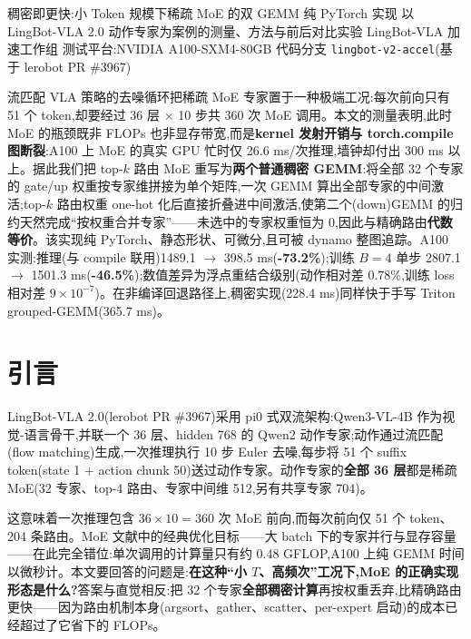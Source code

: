 \documentclass[11pt]{ctexart}
\begin{document}
{稠密即更快:小 Token 规模下稀疏 MoE 的双 GEMM 纯 PyTorch 实现}
{以 LingBot-VLA 2.0 动作专家为案例的测量、方法与前后对比实验}
{LingBot-VLA 加速工作组 \quad 测试平台:NVIDIA A100-SXM4-80GB \quad 代码分支 \texttt{lingbot-v2-accel}(基于 lerobot PR \#3967)}

\begin{cnabstract}
流匹配 VLA 策略的去噪循环把稀疏 MoE 专家置于一种极端工况:每次前向只有 51 个 token,却要经过 36 层 $\times$ 10 步共 360 次 MoE 调用。本文的测量表明,此时 MoE 的瓶颈既非 FLOPs 也非显存带宽,而是\textbf{kernel 发射开销与 torch.compile 图断裂}:A100 上 MoE 的真实 GPU 忙时仅 26.6 ms/次推理,墙钟却付出 300 ms 以上。据此我们把 top-$k$ 路由 MoE 重写为\textbf{两个普通稠密 GEMM}:将全部 32 个专家的 gate/up 权重按专家维拼接为单个矩阵,一次 GEMM 算出全部专家的中间激活;top-$k$ 路由权重 one-hot 化后直接折叠进中间激活,使第二个(down)GEMM 的归约天然完成``按权重合并专家''——未选中的专家权重恒为 0,因此与精确路由\textbf{代数等价}。该实现纯 PyTorch、静态形状、可微分,且可被 dynamo 整图追踪。A100 实测:推理(与 compile 联用)1489.1 $\to$ 398.5 ms(\textbf{-73.2\%});训练 $B{=}4$ 单步 2807.1 $\to$ 1501.3 ms(\textbf{-46.5\%});数值差异为浮点重结合级别(动作相对差 0.78\%,训练 loss 相对差 $9\times10^{-7}$)。在非编译回退路径上,稠密实现(228.4 ms)同样快于手写 Triton grouped-GEMM(365.7 ms)。
\end{cnabstract}

\section{引言}
LingBot-VLA 2.0(lerobot PR \#3967)采用 pi0 式双流架构:Qwen3-VL-4B 作为视觉-语言骨干,并联一个 36 层、hidden 768 的 Qwen2 动作专家;动作通过流匹配(flow matching)生成,一次推理执行 10 步 Euler 去噪,每步将 51 个 suffix token(state 1 + action chunk 50)送过动作专家。动作专家的\textbf{全部 36 层}都是稀疏 MoE(32 专家、top-4 路由、专家中间维 512,另有共享专家 704)。

这意味着一次推理包含 $36 \times 10 = 360$ 次 MoE 前向,而每次前向仅 51 个 token、204 条路由。MoE 文献中的经典优化目标——大 batch 下的专家并行与显存容量——在此完全错位:单次调用的计算量只有约 0.48 GFLOP,A100 上纯 GEMM 时间以微秒计。本文要回答的问题是:\textbf{在这种``小 $T$、高频次''工况下,MoE 的正确实现形态是什么?}答案与直觉相反:把 32 个专家\textbf{全部稠密计算}再按权重丢弃,比精确路由更快——因为路由机制本身(argsort、gather、scatter、per-expert 启动)的成本已经超过了它省下的 FLOPs。
\end{document}

